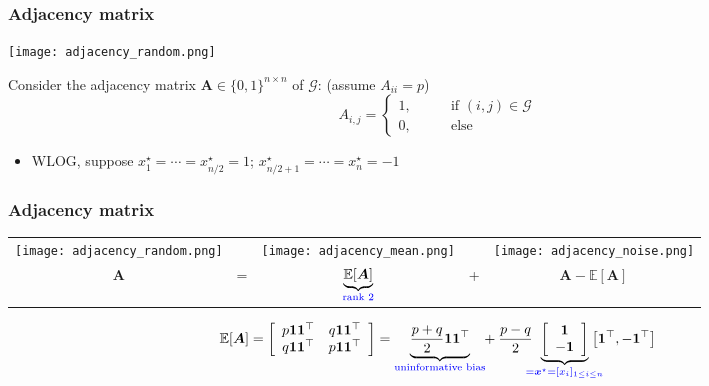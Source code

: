 \documentclass[compress,
mathserif,wide,%
]{beamer}
\begin{document}
\begin{frame}
\frametitle{Adjacency matrix}



\begin{center}
\texttt{[image: adjacency\_random.png]} 
\end{center}


Consider the adjacency matrix $\bm{A}\in \{0,1\}^{n\times n}$ of $\mathcal{G}$: (assume $A_{ii} = p$)
%
\[
	A_{i,j} = \begin{cases}  1, \qquad & \text{if } (i,j) \in \mathcal{G} \\ 0, & \text{else} \end{cases}
\]

\vspace{-0.5em}
\begin{itemize}
	\item WLOG, suppose $x_1^{\star}=\cdots=x_{n/2}^{\star}=1$; $x_{n/2+1}^{\star}=\cdots=x_n^{\star}=-1$ 
\end{itemize}


\end{frame}




\begin{frame}
\frametitle{Adjacency matrix}


		
\begin{center}
\begin{tabular}{ccccc}
\texttt{[image: adjacency\_random.png]} &   & \texttt{[image: adjacency\_mean.png]} &  & \texttt{[image: adjacency\_noise.png]}\tabularnewline
	$\bm{A}$ & = & $\underset{\textcolor{blue}{ \text{rank 2}}}{\underbrace{\mathbb{E}[\bm{A}]}}$ & + & $\bm{A}-\mathbb{E}\left[\bm{A}\right]$\tabularnewline
\end{tabular}
\end{center}


{\small $$\mathbb{E}[\bm{A}]=\left[\begin{array}{cc}
p\bm{1}\bm{1}^{\top} & q\bm{1}\bm{1}^{\top}\\
q\bm{1}\bm{1}^{\top} & p\bm{1}\bm{1}^{\top}
\end{array}\right]=\underset{\textcolor{blue}{ \text{uninformative bias}}}{\underbrace{\frac{p+q}{2}\bm{1}\bm{1}^{\top}}} \hspace{-0.3em} +\frac{p-q}{2} \hspace{-0.5em}\underset{\textcolor{blue}{ =\bm{x}^{\star}=[x_i]_{1\leq i\leq n}}}{\underbrace{\left[\begin{array}{c}
\bm{1}\\
-\bm{1}
\end{array}\right]}} \hspace{-1em} \left[\bm{1}^{\top},-\bm{1}^{\top}\right]$$ }

		
\end{frame}
\end{document}
